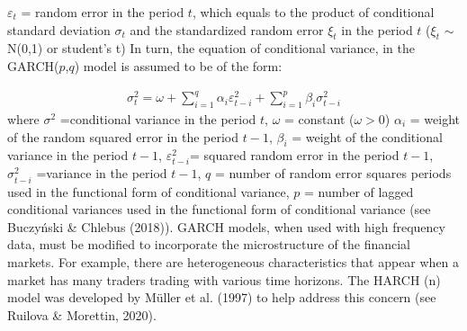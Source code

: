 \documentclass[a4paper,11pt,oneside]{book}
\begin{document}
$\varepsilon_t$ = random error in the period $t$, which equals to the
product of conditional standard deviation $\sigma_t$ and  the
standardized random error $\xi_t$ in the period $t$ ($\xi_t$ $\sim$ N(0,1) or student's t)
\newline\newline
In turn, the equation of conditional variance, in the GARCH($p$,$q$) model is assumed to be of the form:


\begin{equation}
\begin{aligned}
\sigma^2_t = \omega + \sum_{i=1}^{q}\alpha_{i}\varepsilon^{2}_{t-i} + \sum_{i=1}^{p}\beta_{i} \sigma^2_{t-i}
\label{7}
\end{aligned}
\end{equation}
where $\sigma^2$ =conditional variance in the period $t$,\newline
$\omega$ = constant ($\omega>0$)\newline
$\alpha_{i}$ = weight of the random squared error in the period $t-1$,\newline
$\beta_{i}$ = weight of the conditional variance in the period $t-1$,\newline
$\varepsilon^{2}_{t-i}$= squared random error in the period $t-1$,\newline
$\sigma^2_{t-i}$ =variance in the period $t-1$,\newline
$q$ = number of random error squares periods used in the functional form of conditional variance,\newline
$p$ = number of lagged conditional variances used in the
functional form of conditional variance (see Buczyński \& Chlebus (2018)).\newline\newline
 GARCH models, when used with high frequency data, must be modified to incorporate the microstructure of the financial markets. For example, there are heterogeneous characteristics that appear when a market has many traders trading with various time horizons. The HARCH (n) model was developed by Müller et al. (1997) to help address this concern (see Ruilova \& Morettin, 2020).
\end{document}
